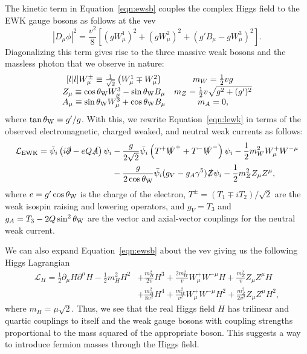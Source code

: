 The kinetic term in Equation~\ref{eqn:ewsb} couples the complex Higgs field to the EWK gauge bosons as follows at the vev
\begin{equation}
  \left| D_\mu \phi \right|^2 = \frac{v^2}{8} \left[ \left(g W_\mu^1 \right)^2 + \left(g W_\mu^2 \right)^2 + \left(g' B_\mu - g W_\mu^3 \right)^2 \right].
\end{equation}
Diagonalizing this term gives rise to the three massive weak bosons and the massless photon that we observe in nature:
\begin{equation}
  \begin{matrix}[l | l]
    W_\mu^{\pm} \equiv \frac{1}{\sqrt{2}} \left( W_\mu^1 \mp W_\mu^2 \right)
    & m_W = \frac{1}{2} vg \\
    Z_\mu \equiv \cos \theta_{\text{W}} W_\mu^3 - \sin \theta_{\text{W}} B_\mu
    & m_Z = \frac{1}{2} v \sqrt{g^2 + (g')^2} \\
    A_\mu \equiv \sin \theta_{\text{W}} W_\mu^3 + \cos \theta_{\text{W}} B_\mu
    & m_A = 0,
  \end{matrix}
\end{equation}
where $\tan \theta_{\text{W}} = g'/g$.
With this, we rewrite Equation~\ref{eqn:lewk} in terms of the observed electromagnetic, charged weaked, and neutral weak currents as follows:
\begin{align}
  \label{eqn:lewsb}
  \mathcal{L}_{\text{EWK}} %
  = \bar \psi_i \left( i \slashed \partial - e Q \slashed A \right) \psi_i
  & - \frac{g}{2\sqrt{2}} \bar \psi_i \left( T^+ \slashed W^+ + T^- \slashed W^- \right) \psi_i - \frac{1}{2} m_W^2 W_\mu^+ W^{-\mu} \nonumber \\
   & - \frac{g}{2 \cos \thetaw} \bar \psi_i (g_V - g_A \gamma^5) \slashed Z \psi_i - \frac{1}{2} m_Z^2 Z_\mu Z^\mu, 
\end{align}
where $e = g' \cos \theta_{\text{W}}$ is the charge of the electron, $T^\pm = (T_1 \mp i T_2)/\sqrt{2}$ are the weak isospin raising and lowering operators, and $g_V = T_3$ and $g_A = T_3 - 2 Q \sin^2 \theta_{\text{W}}$ are the vector and axial-vector couplings for the neutral weak current.

We can also expand Equation~\ref{eqn:ewsb} about the vev giving us the following Higgs Lagrangian
\begin{align}
  \mathcal{L}_H = \frac{1}{2} \partial_\mu H \partial^\mu H - \frac{1}{2} m_H^2 H^2
  & + \frac{m_H^2}{2 v} H^3 + \frac{2 m_W^2}{v} W_\mu^+ W^{-\mu} H + \frac{m_Z^2}{v} Z_\mu Z^\mu H \nonumber \\
  & + \frac{m_H^2}{8 v^2} H^4 + \frac{m_W^2}{v^2} W_\mu^+ W^{-\mu} H^2 + \frac{m_Z^2}{2v^2} Z_\mu Z^\mu H^2, 
\end{align}
where $m_H = \mu \sqrt{2} $.
Thus, we see that the real Higgs field $H$ has trilinear and quartic couplings to itself and the weak gauge bosons with coupling strengths proportional to the mass squared of the appropriate boson.
This suggests a way to introduce fermion masses through the Higgs field.

